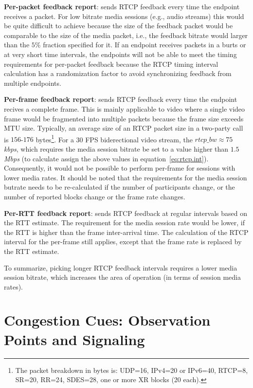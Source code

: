 \textbf{Per-packet feedback report}: sends RTCP feedback every time the
endpoint receives a packet. For low bitrate media sessions (e.g., audio
streams) this would be quite difficult to achieve because the size of the
feedback packet would be comparable to the size of the media packet, i.e., the
feedback bitrate would larger than the $5\%$ fraction specified for it. If an
endpoint receives packets in a burts or at very short time intervals, the
endpoints will not be able to meet the timing requirements for per-packet
feedback because the RTCP timing interval calculation has a randomization
factor to avoid synchronizing feedback from multiple endpoints.

\textbf{Per-frame feedback report}: sends RTCP feedback every time the
endpoint recives a complete frame. This is mainly applicable to video where a
single video frame would be fragmented into multiple packets because the frame
size exceeds MTU size. Typically, an average size of an RTCP packet size in a
two-party call is $156$-$176$ bytes\footnote{The packet breakdown in bytes is:
UDP=16, IPv4=20 or IPv6=40, RTCP=8, SR=20, RR=24, SDES=28, one or more XR
blocks (20 each).}. For a 30 FPS biderectional video stream, the $rtcp\_bw
\approx 75$ \emph{kbps}, which requires the media session bitrate be set to a
value higher than $1.5$ \emph{Mbps} (to calculate assign the above values in
equation~\ref{eq:rtcp.int}). Consequently, it would not be possible to perform
per-frame for sessions with lower media rates. It should be noted that the
requirements for the media session butrate needs to be re-calculated if the
number of participants change, or the number of reported blocks change or the
frame rate changes.

\textbf{Per-RTT feedback report}: sends RTCP feedback at regular intervals
based on the RTT estimate. The requirement for the media session rate would be
lower, if the RTT is higher than the frame inter-arrival time. The calculation
of the RTCP interval for the per-frame still applies, except that the frame
rate is replaced by the RTT estimate.

To summarize, picking longer RTCP feedback intervals requires a lower media
session bitrate, which increases the area of operation (in terms of session
media rates).

\section{Congestion Cues: Observation Points and Signaling}
\label{fw.fw}

